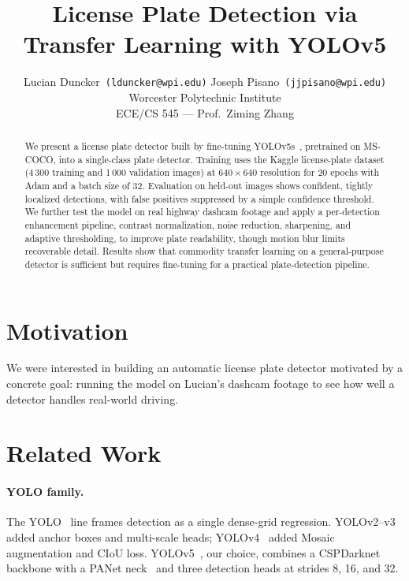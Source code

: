 \documentclass[times,10pt,twocolumn]{article}
\title{License Plate Detection via Transfer Learning with YOLOv5}
\author{
  Lucian Duncker~{\tt\small (lduncker@wpi.edu)} \quad
  Joseph Pisano~{\tt\small (jjpisano@wpi.edu)}\\[0.2em]
  Worcester Polytechnic Institute\\[0.1em]
  {\small ECE/CS 545 --- Prof.\ Ziming Zhang}
}
\begin{document}
\maketitle

\begin{abstract}
We present a license plate detector built by fine-tuning
YOLOv5s~\cite{jocher2020yolov5}, pretrained on MS-COCO, into a
single-class plate detector. Training uses the Kaggle license-plate dataset (4\,300
training and 1\,000 validation images) at $640\!\times\!640$
resolution for 20 epochs with Adam and a batch size of 32.
Evaluation on held-out images shows
confident, tightly localized detections, with false positives
suppressed by a simple confidence threshold. We further test the
model on real highway dashcam footage and apply a per-detection
enhancement pipeline, contrast normalization, noise reduction,
sharpening, and adaptive thresholding, to improve plate
readability, though motion blur limits recoverable detail. Results
show that commodity transfer learning on a general-purpose detector
is sufficient but requires fine-tuning for a practical plate-detection pipeline.
\end{abstract}

\section{Motivation}
\label{sec:motivation}

We were interested in building an automatic license plate detector
motivated by a concrete goal: running the model on Lucian's dashcam
footage to see how well a detector handles real-world
 driving.

\section{Related Work}
\label{sec:related}

\paragraph{YOLO family.}
The YOLO~\cite{redmon2016yolo} line frames detection as a single
dense-grid regression. YOLOv2--v3~\cite{redmon2017yolov2,redmon2018yolov3}
added anchor boxes and multi-scale heads; YOLOv4~\cite{bochkovskiy2020yolov4}
added Mosaic augmentation and CIoU loss. YOLOv5~\cite{jocher2020yolov5},
our choice, combines a CSPDarknet backbone with a PANet
neck~\cite{liu2018panet} and three detection heads at strides 8, 16,
and 32.
\end{document}
